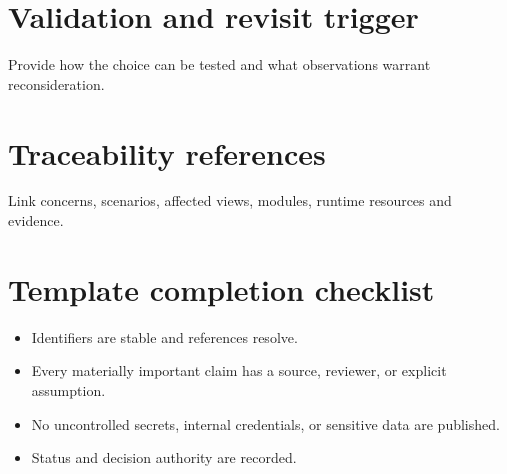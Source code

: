 \documentclass[10pt,letterpaper]{article}
\begin{document}
\section{Validation and revisit trigger}
Provide how the choice can be tested and what observations warrant reconsideration.

\section{Traceability references}
Link concerns, scenarios, affected views, modules, runtime resources and evidence.

\section{Template completion checklist}
\begin{itemize}
\item Identifiers are stable and references resolve.
\item Every materially important claim has a source, reviewer, or explicit assumption.
\item No uncontrolled secrets, internal credentials, or sensitive data are published.
\item Status and decision authority are recorded.
\end{itemize}
\end{document}
